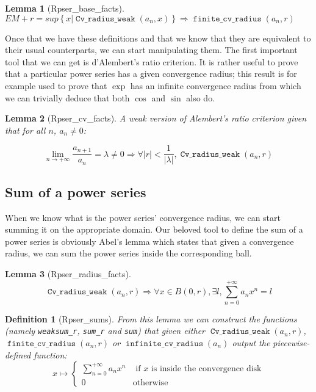 \documentclass[submission,copyright]{eptcs}
\DeclareMathOperator{\cvrw}{\mathtt{Cv\_radius\_weak}}
\DeclareMathOperator{\fcvr}{\mathtt{finite\_cv\_radius}}
\DeclareMathOperator{\icvr}{\mathtt{infinite\_cv\_radius}}
\newtheorem{definition}{Definition}
\newtheorem{lemma}{Lemma}
\begin{document}
\begin{lemma}[Rpser\_base\_facts] $EM + r = sup \left\lbrace x |
\cvrw{}(a_n, x) \right\rbrace \Rightarrow \fcvr{}(a_n,r)$ \end{lemma}

Once that we have these definitions and that we know that they are
equivalent to their usual counterparts, we can start manipulating them.
The first important tool that we can get is d'Alembert's ratio criterion.
It is rather useful to prove that a particular power series has a given
convergence radius; this result is for example used to prove that $\exp$
has an infinite convergence radius from which we can trivially deduce
that both $\cos$ and $\sin$ also do.

\begin{lemma}[Rpser\_cv\_facts] A weak version of Alembert's ratio
criterion given that for all $n$, $a_n \neq 0$:

$$\lim\limits_{n \to + \infty}\frac{a_{n+1}}{a_n} = \lambda \neq 0
  \Rightarrow \forall \left| r \right| < \frac{1}{\left| \lambda \right|
  }, \cvrw{}(a_n,r)$$
\end{lemma}

\subsection{Sum of a power series}

When we know what is the power series' convergence radius, we can start
summing it on the appropriate domain. Our beloved tool to define the sum
of a power series is obviously Abel's lemma which states that given a
convergence radius, we can sum the power series inside the corresponding
ball.

\begin{lemma}[Rpser\_radius\_facts] $$\cvrw{}(a_n,r) \Rightarrow
\forall x \in B(0,r), \exists l, \sum_{n=0}^{+\infty} a_n x^n = l$$
\end{lemma}

\begin{definition}[Rpser\_sums] From this lemma we can construct the functions
(namely \texttt{weaksum\_r}, \texttt{sum\_r} and \texttt{sum}) that given either
$\cvrw{}(a_n,r)$, $\fcvr{}(a_n,r)$ or $\icvr{}(a_n)$ output the piecewise-defined
function: $$x \mapsto \left\lbrace
\begin{array}{ll}
\sum_{n=0}^{+\infty} a_n x^n & \text{ if } x \text{ is inside the convergence
disk}\\
0 & \text{otherwise}
\end{array}\right.$$
\end{definition}
\end{document}
